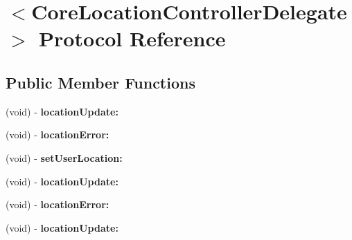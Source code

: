 \hypertarget{protocol_core_location_controller_delegate-p}{
\section{$<$\-Core\-Location\-Controller\-Delegate$>$ \-Protocol \-Reference}
\label{protocol_core_location_controller_delegate-p}
}
\subsection*{\-Public \-Member \-Functions}
\begin{DoxyCompactItemize}
\item 
\hypertarget{protocol_core_location_controller_delegate-p_a307b2da0e181220b1ab110d9556f0d24}{
(void) -\/ {\bfseries location\-Update\-:}}
\label{protocol_core_location_controller_delegate-p_a307b2da0e181220b1ab110d9556f0d24}

\item 
\hypertarget{protocol_core_location_controller_delegate-p_a8e6db3262b0173ab7e72759afa0f167e}{
(void) -\/ {\bfseries location\-Error\-:}}
\label{protocol_core_location_controller_delegate-p_a8e6db3262b0173ab7e72759afa0f167e}

\item 
\hypertarget{protocol_core_location_controller_delegate-p_ae2f61274e3beb39cdd5181c28c346959}{
(void) -\/ {\bfseries set\-User\-Location\-:}}
\label{protocol_core_location_controller_delegate-p_ae2f61274e3beb39cdd5181c28c346959}

\item 
\hypertarget{protocol_core_location_controller_delegate-p_a307b2da0e181220b1ab110d9556f0d24}{
(void) -\/ {\bfseries location\-Update\-:}}
\label{protocol_core_location_controller_delegate-p_a307b2da0e181220b1ab110d9556f0d24}

\item 
\hypertarget{protocol_core_location_controller_delegate-p_a8e6db3262b0173ab7e72759afa0f167e}{
(void) -\/ {\bfseries location\-Error\-:}}
\label{protocol_core_location_controller_delegate-p_a8e6db3262b0173ab7e72759afa0f167e}

\item 
\hypertarget{protocol_core_location_controller_delegate-p_a307b2da0e181220b1ab110d9556f0d24}{
(void) -\/ {\bfseries location\-Update\-:}}
\label{protocol_core_location_controller_delegate-p_a307b2da0e181220b1ab110d9556f0d24}


\end{DoxyCompactItemize}
